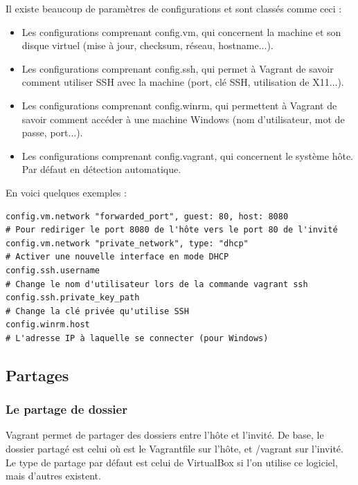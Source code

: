 \documentclass[12pt,a4paper]{article}
\begin{document}
Il existe beaucoup de paramètres de configurations et sont classés comme ceci : 
\begin{itemize}
	\item{Les configurations comprenant config.vm, qui concernent la machine et son disque virtuel (mise à jour, checksum, réseau, hostname...).}
	\item{Les configurations comprenant config.ssh, qui permet à Vagrant de savoir comment utiliser SSH avec la machine (port, clé SSH, utilisation de X11...).} 
	\item{Les configurations comprenant config.winrm, qui permettent à Vagrant de savoir comment accéder à une machine Windows (nom d'utilisateur, mot de passe, port...).}
	\item{Les configurations comprenant config.vagrant, qui concernent le système hôte. Par défaut en détection automatique.}
\end{itemize}
En voici quelques exemples :
\begin{lstlisting}
config.vm.network "forwarded_port", guest: 80, host: 8080 
# Pour rediriger le port 8080 de l'hôte vers le port 80 de l'invité
config.vm.network "private_network", type: "dhcp" 
# Activer une nouvelle interface en mode DHCP
config.ssh.username
# Change le nom d'utilisateur lors de la commande vagrant ssh
config.ssh.private_key_path
# Change la clé privée qu'utilise SSH
config.winrm.host
# L'adresse IP à laquelle se connecter (pour Windows)
\end{lstlisting}

\subsection{Partages}

\subsubsection{Le partage de dossier}
Vagrant permet de partager des dossiers entre l'hôte et l'invité. De base, le dossier partagé est celui où est le Vagrantfile sur l'hôte, et /vagrant sur l'invité. Le type de partage par défaut est celui de VirtualBox si l'on utilise ce logiciel, mais d'autres existent.
\end{document}
